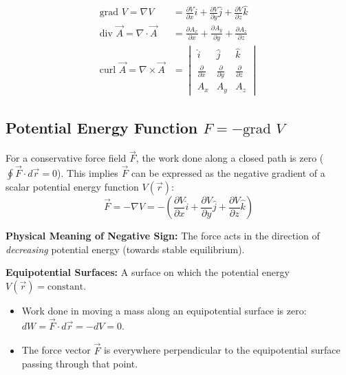 \documentclass[12pt,a4paper]{article}
\begin{document}
\begin{tcolorbox}[formulabox, title={\textbf{Mathematical Definitions in Cartesian Coordinates}}]
\begin{align}
\text{grad } V = \nabla V &= \frac{\partial V}{\partial x}\hat{i} + \frac{\partial V}{\partial y}\hat{j} + \frac{\partial V}{\partial z}\hat{k} \\[4pt]
\text{div } \vec{A} = \nabla \cdot \vec{A} &= \frac{\partial A_x}{\partial x} + \frac{\partial A_y}{\partial y} + \frac{\partial A_z}{\partial z} \\[4pt]
\text{curl } \vec{A} = \nabla \times \vec{A} &= 
\begin{vmatrix}
\hat{i} & \hat{j} & \hat{k} \\
\frac{\partial}{\partial x} & \frac{\partial}{\partial y} & \frac{\partial}{\partial z} \\
A_x & A_y & A_z
\end{vmatrix}
\end{align}
\end{tcolorbox}

\subsection{\texorpdfstring{Potential Energy Function $F = -\text{grad } V$}{Potential Energy Function F = -grad V}}

For a conservative force field $\vec{F}$, the work done along a closed path is zero ($\oint \vec{F} \cdot d\vec{r} = 0$). This implies $\vec{F}$ can be expressed as the negative gradient of a scalar potential energy function $V(\vec{r})$:
\begin{equation}
\vec{F} = -\nabla V = -\left(\frac{\partial V}{\partial x}\hat{i} + \frac{\partial V}{\partial y}\hat{j} + \frac{\partial V}{\partial z}\hat{k}\right)
\end{equation}

\textbf{Physical Meaning of Negative Sign:} The force acts in the direction of \textit{decreasing} potential energy (towards stable equilibrium).

\textbf{Equipotential Surfaces:} A surface on which the potential energy $V(\vec{r}) = \text{constant}$.
\begin{itemize}[leftmargin=*, itemsep=2pt]
  \item Work done in moving a mass along an equipotential surface is zero: $dW = \vec{F} \cdot d\vec{r} = -dV = 0$.
  \item The force vector $\vec{F}$ is everywhere perpendicular to the equipotential surface passing through that point.
\end{itemize}
\end{document}
